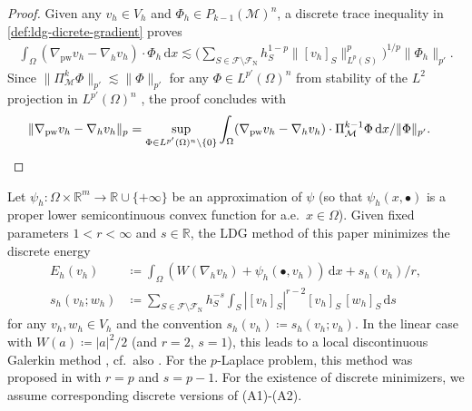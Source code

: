 \documentclass[a4paper]{amsart}
\numberwithin{equation}{section}
\renewcommand{\d}[1]{\,\mathrm{d}#1}
\newcommand{\Mcal}{\mathcal{M}}
\newcommand{\pw}{\mathrm{pw}}
\theoremstyle{remark}
\begin{document}
\begin{proof}
	Given any $v_h \in V_h$ and $\Phi_h \in P_{k-1}(\Mcal)^n$, a discrete trace inequality in \eqref{def:ldg-dicrete-gradient} proves
	\begin{align*}
		\int_\Omega (\nabla_\pw v_h - \nabla_h v_h) \cdot \Phi_h \d{x} \lesssim \Big(\sum_{S \in \mathcal{F} \setminus \mathcal{F}_\mathrm{N}} h_S^{1-p}\|[v_h]_S\|_{L^p(S)}^p\Big)^{1/p}\|\Phi_h\|_{p'}.
	\end{align*}
	Since $\|\Pi_\Mcal^k \Phi\|_{p'} \lesssim \|\Phi\|_{p'}$ for any $\Phi \in L^{p'}(\Omega)^n$ from stability of the $L^2$ projection in $L^{p'}(\Omega)^n$ \cite[Lemma 3.2]{DiPietroDroniou2017}, the proof concludes with
	\begin{align*}
		\|\nabla_\pw v_h - \nabla_h v_h\|_{p} &= \sup_{\Phi \in L^{p'}(\Omega)^n \setminus \{0\}} \int_\Omega (\nabla_\pw v_h - \nabla_h v_h) \cdot \Pi_\Mcal^{k-1} \Phi \d{x}/\|\Phi\|_{p'}.\qedhere
	\end{align*}
\end{proof}
Let $\psi_h : \Omega \times \mathbb{R}^m \to \mathbb{R} \cup \{+\infty\}$ be an approximation of $\psi$ (so that $\psi_h(x,\bullet)$ is a proper lower semicontinuous convex function for a.e.~$x \in \Omega$).
Given fixed parameters $1<r<\infty$ and $s \in \mathbb{R}$,
the LDG method of this paper minimizes the discrete energy
\begin{align}\label{def:discrete_energy}
	E_h(v_h) &\coloneqq \int_\Omega (W(\nabla_h v_h) 
    + \psi_h(\bullet,v_h)) \d{x} + s_h(v_h)/r,\\
    s_h(v_h; w_h) &\coloneqq 
    \sum_{S \in \mathcal{F} \setminus \mathcal{F}_\mathrm{N}} 
    h_S^{-s}\int_S |[v_h]_S|^{r-2} [v_h]_S\,[w_h]_S \d{s}
\label{def:stabilization-ldg}
\end{align}
for any $v_h, w_h \in V_h$
and the convention $s_h(v_h) \coloneqq s_h(v_h;v_h)$.
In the linear case with $W(a) \coloneqq |a|^2/2$ (and $r =2$, $s = 1$), 
this leads to a local discontinuous Galerkin method \cite{CockburnShu1998}, 
cf.~also \cite[Section 4.4.2]{DiPietroErn2012}. For the $p$-Laplace problem, 
this method was proposed in \cite{BurmanErn2008} with $r = p$ and $s = p-1$.
For the existence of discrete minimizers, we assume 
corresponding discrete versions of (A1)-(A2).
\end{document}
